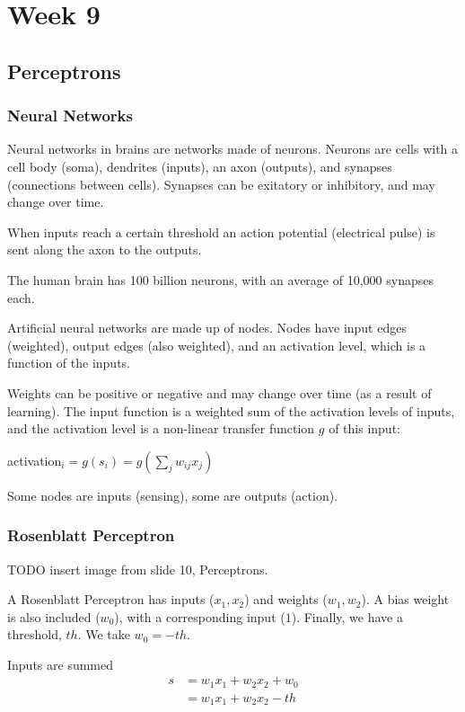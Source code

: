 \part{Week 9}
\chapter{Perceptrons}
\section{Neural Networks}
Neural networks in brains are networks made of neurons. Neurons are cells with
a cell body (soma), dendrites (inputs), an axon (outputs), and synapses
(connections between cells). Synapses can be exitatory or inhibitory, and may
change over time.

When inputs reach a certain threshold an action potential (electrical pulse) is
sent along the axon to the outputs.

The human brain has 100 billion neurons, with an average of 10,000 synapses
each.

Artificial neural networks are made up of nodes. Nodes have input edges
(weighted), output edges (also weighted), and an activation level, which is a
function of the inputs.

Weights can be positive or negative and may change over time (as a result of
learning). The input function is a weighted sum of the activation levels of
inputs, and the activation level is a non-linear transfer function $g$ of this
input:

{\centering
    activation$_i = g(s_i) = g(\sum_j w_{ij}x_j)$

}

Some nodes are inputs (sensing), some are outputs (action).

\section{Rosenblatt Perceptron}
TODO insert image from slide 10, Perceptrons.

A Rosenblatt Perceptron has inputs ($x_1, x_2$) and weights ($w_1, w_2$). A
bias weight is also included ($w_0$), with a corresponding input ($1$).
Finally, we have a threshold, $th$. We take $w_0 = -th$.

Inputs are summed
\begin{align*}
    s &= w_1x_1 + w_2x_2 + w_0\\
      &= w_1x_1 + w_2x_2 - th
\end{align*}

